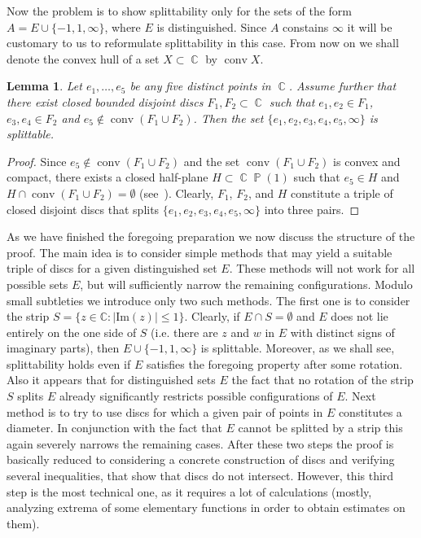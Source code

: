 \documentclass{amsart}
\numberwithin{equation}{section}
\newtheorem{lemma}[theorem]{Lemma}
\theoremstyle{definition}
\theoremstyle{remark}
\DeclareMathOperator{\conv}{conv}
\DeclareMathOperator{\CC}{\mathbb C}
\DeclareMathOperator{\PP}{\mathbb P}
\begin{document}
	Now the problem is to show splittability only for the sets of the form $A = E \cup \{-1,1,\infty\}$, where $E$ is distinguished. Since $A$ constains $\infty$ it will be customary to us to reformulate splittability in this case. From now on we shall denote the convex hull of a set $X \subset \CC$ by $\conv X$.
	
	\begin{lemma}\label{lemFinishingSplitting}
		Let $e_1, \dots, e_5$ be any five distinct points in $\CC$. Assume further that there exist closed bounded disjoint discs $F_1, F_2 \subset \CC$ such that $e_1, e_2 \in F_1$, $e_3, e_4 \in F_2$ and $e_5 \notin \conv(F_1 \cup F_2)$. Then the set $\{e_1, e_2, e_3, e_4, e_5, \infty\}$ is splittable.
	\end{lemma}
	\begin{proof}
		Since $e_5 \notin \conv(F_1 \cup F_2)$ and the set $\conv(F_1 \cup F_2)$ is convex and compact, there exists a closed half-plane $H \subset \CC\PP(1)$ such that $e_5 \in H$ and $H \cap \conv(F_1 \cup F_2) = \emptyset$ (see~\cite[Theorems~1.12 and~1.14]{ConvexLectures}). Clearly, $F_1$, $F_2$, and $H$ constitute a triple of closed disjoint discs that splits $\{e_1, e_2, e_3, e_4, e_5, \infty\}$ into three pairs.
	\end{proof}
	
	As we have finished the foregoing preparation we now discuss the structure of the proof. The main idea is to consider simple methods that may yield a suitable triple of discs for a given distinguished set $E$. These methods will not work for all possible sets $E$, but will sufficiently narrow the remaining configurations. Modulo small subtleties we introduce only two such methods. The first one is to consider the strip $S = \{z \in \mathbb C: |\mathrm{Im}(z)| \le 1\}$. Clearly, if $E \cap S = \emptyset$ and $E$ does not lie entirely on the one side of $S$ (i.e. there are $z$ and $w$ in $E$ with distinct signs of imaginary parts), then $E \cup \{-1,1,\infty\}$ is splittable. Moreover, as we shall see, splittability holds even if $E$ satisfies the foregoing property after some rotation. Also it appears that for distinguished sets $E$ the fact that no rotation of the strip $S$ splits $E$ already significantly restricts possible configurations of $E$. Next method is to try to use discs for which a given pair of points in $E$ constitutes a diameter. In conjunction with the fact that $E$ cannot be splitted by a strip this again severely narrows the remaining cases. After these two steps the proof is basically reduced to considering a concrete construction of discs and verifying several inequalities, that show that discs do not intersect. However, this third step is the most technical one, as it requires a lot of calculations (mostly, analyzing extrema of some elementary functions in order to obtain estimates on them).
	
\end{document}
